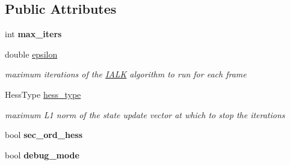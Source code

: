 \subsection*{Public Attributes}
\begin{DoxyCompactItemize}
\item 
\hypertarget{structIALKParams_abbc8d072e4003a2b2d860517efe7f4a0}{int {\bfseries max\-\_\-iters}}\label{structIALKParams_abbc8d072e4003a2b2d860517efe7f4a0}

\item 
\hypertarget{structIALKParams_ac88ea122543c062702a53294b2933266}{double \hyperlink{structIALKParams_ac88ea122543c062702a53294b2933266}{epsilon}}\label{structIALKParams_ac88ea122543c062702a53294b2933266}

\begin{DoxyCompactList}\small\item\em maximum iterations of the \hyperlink{classIALK}{I\-A\-L\-K} algorithm to run for each frame \end{DoxyCompactList}\item 
\hypertarget{structIALKParams_a11111c7058984020a1b89ac473da8fb8}{Hess\-Type \hyperlink{structIALKParams_a11111c7058984020a1b89ac473da8fb8}{hess\-\_\-type}}\label{structIALKParams_a11111c7058984020a1b89ac473da8fb8}

\begin{DoxyCompactList}\small\item\em maximum L1 norm of the state update vector at which to stop the iterations \end{DoxyCompactList}\item 
\hypertarget{structIALKParams_a9cec9fe2c7f76a5be66b6b19f02daed9}{bool {\bfseries sec\-\_\-ord\-\_\-hess}}\label{structIALKParams_a9cec9fe2c7f76a5be66b6b19f02daed9}

\item 
\hypertarget{structIALKParams_a745a6ab9e74acdf4c36f9c39a022f603}{bool {\bfseries debug\-\_\-mode}}\label{structIALKParams_a745a6ab9e74acdf4c36f9c39a022f603}

\end{DoxyCompactItemize}


